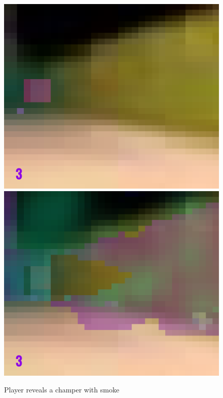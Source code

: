 \begin{figure}[p]
  \centering
  \includegraphics[width=\imgWidth]{images/game_systems/ChamperNoSmoke.png} \\[\picVdist]
  \includegraphics[width=\imgWidth]{images/game_systems/ChamperInSmoke.png}
  \caption{Player reveals a champer with smoke}
  \label{UncoverChamper}
\end{figure}
